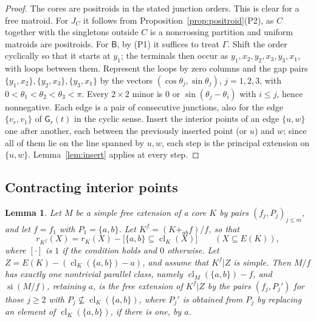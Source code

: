 \documentclass[11pt]{amsart}
\newtheorem{lemma}[theorem]{Lemma}
\theoremstyle{definition}
\theoremstyle{remark}
\numberwithin{equation}{section}
\newcommand{\cl}{\operatorname{cl}}
\newcommand{\si}{\operatorname{si}}
\newcommand{\GW}{\mathsf{G}}
\newcommand{\FB}{\mathsf{B}}
\begin{document}
\begin{proof}
The cores are positroids in the stated junction orders. This is clear for a free matroid. For $J_C$ it follows from Proposition~\ref{prop:positroid}(P2), as $C$ together with the singletons outside $C$ is a noncrossing partition and uniform matroids are positroids. For $\FB$, by (P1) it suffices to treat $\Gamma$. Shift the order cyclically so that it starts at $y_1$; the terminals then occur as $y_1,x_2,y_2,x_3,y_3,x_1$, with loops between them. Represent the loops by zero columns and the gap pairs $\{y_1,x_2\},\{y_2,x_3\},\{y_3,x_1\}$ by the vectors $(\cos\theta_j,\sin\theta_j)$, $j=1,2,3$, with $0<\theta_1<\theta_2<\theta_3<\pi$. Every $2\times2$ minor is $0$ or $\sin(\theta_j-\theta_i)$ with $i\le j$, hence nonnegative. Each edge is a pair of consecutive junctions, also for the edge $\{v_r,v_1\}$ of $\GW_r(t)$ in the cyclic sense. Insert the interior points of an edge $\{u,w\}$ one after another, each between the previously inserted point (or $u$) and $w$; since all of them lie on the line spanned by $u,w$, each step is the principal extension on $\{u,w\}$. Lemma~\ref{lem:insert} applies at every step.
\end{proof}

\subsection{Contracting interior points}

\begin{lemma}\label{lem:modelcontract}
Let $M$ be a simple free extension of a core $K$ by pairs $(f_j,P_j)_{j\le m}$, and let $f=f_1$ with $P_1=\{a,b\}$. Let $K^f=(K+_{ab}f)/f$, so that
\[
r_{K^f}(X)=r_K(X)-\big[\{a,b\}\subseteq\cl_K(X)\big]\qquad(X\subseteq E(K)),
\]
where $[\cdot]$ is $1$ if the condition holds and $0$ otherwise. Let $Z=E(K)-(\cl_K(\{a,b\})-a)$, and assume that $K^f|Z$ is simple. Then $M/f$ has exactly one nontrivial parallel class, namely $\cl_M(\{a,b\})-f$, and $\si(M/f)$, retaining $a$, is the free extension of $K^f|Z$ by the pairs $(f_j,P_j')$ for those $j\ge2$ with $P_j\not\subseteq\cl_K(\{a,b\})$, where $P_j'$ is obtained from $P_j$ by replacing an element of $\cl_K(\{a,b\})$, if there is one, by $a$.
\end{lemma}
\end{document}

